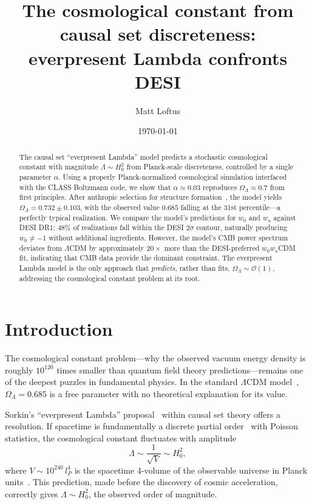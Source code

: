 \documentclass[aps,prd,twocolumn,superscriptaddress,nofootinbib]{revtex4-2}
\begin{document}
\title{The cosmological constant from causal set discreteness:\\everpresent Lambda confronts DESI}

\author{Matt Loftus}

\date{\today}

\begin{abstract}
The causal set ``everpresent Lambda'' model predicts a stochastic cosmological constant with magnitude $\Lambda \sim H_0^2$ from Planck-scale discreteness, controlled by a single parameter $\alpha$. Using a properly Planck-normalized cosmological simulation interfaced with the CLASS Boltzmann code, we show that $\alpha \approx 0.03$ reproduces $\Omega_\Lambda \approx 0.7$ from first principles. After anthropic selection for structure formation~\cite{weinberg1987}, the model yields $\Omega_\Lambda = 0.732 \pm 0.103$, with the observed value $0.685$ falling at the 31st percentile---a perfectly typical realization. We compare the model's predictions for $w_0$ and $w_a$ against DESI DR1: 48\% of realizations fall within the DESI $2\sigma$ contour, naturally producing $w_0 \neq -1$ without additional ingredients. However, the model's CMB power spectrum deviates from $\Lambda$CDM by approximately $20\times$ more than the DESI-preferred $w_0 w_a$CDM fit, indicating that CMB data provide the dominant constraint. The everpresent Lambda model is the only approach that \emph{predicts}, rather than fits, $\Omega_\Lambda \sim \mathcal{O}(1)$, addressing the cosmological constant problem at its root.
\end{abstract}

\maketitle

\section{Introduction}

The cosmological constant problem---why the observed vacuum energy density is roughly $10^{120}$ times smaller than quantum field theory predictions---remains one of the deepest puzzles in fundamental physics. In the standard $\Lambda$CDM model~\cite{planck2018}, $\Omega_\Lambda = 0.685$ is a free parameter with no theoretical explanation for its value.

Sorkin's ``everpresent Lambda'' proposal~\cite{sorkin1991,sorkin1997} within causal set theory offers a resolution. If spacetime is fundamentally a discrete partial order~\cite{bombelli1987,surya2019} with Poisson statistics, the cosmological constant fluctuates with amplitude
\begin{equation}
\Lambda \sim \frac{1}{\sqrt{V}} \sim H_0^2,
\label{eq:sorkin}
\end{equation}
where $V \sim 10^{240}\, l_P^4$ is the spacetime 4-volume of the observable universe in Planck units~\cite{ahmed2004}. This prediction, made before the discovery of cosmic acceleration, correctly gives $\Lambda \sim H_0^2$, the observed order of magnitude.
\end{document}
